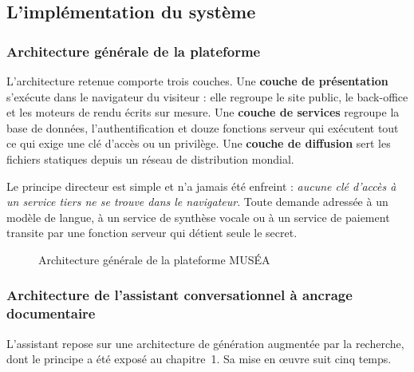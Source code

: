 \subsection{L'implémentation du système}
\label{sec:implementation}

\subsubsection{Architecture générale de la plateforme}

L'architecture retenue comporte trois couches. Une \textbf{couche de
présentation} s'exécute dans le navigateur du visiteur : elle regroupe le site
public, le back-office et les moteurs de rendu écrits sur mesure. Une
\textbf{couche de services} regroupe la base de données, l'authentification et
douze fonctions serveur qui exécutent tout ce qui exige une clé d'accès ou un
privilège. Une \textbf{couche de diffusion} sert les fichiers statiques depuis
un réseau de distribution mondial.

Le principe directeur est simple et n'a jamais été enfreint : \emph{aucune clé
d'accès à un service tiers ne se trouve dans le navigateur}. Toute demande
adressée à un modèle de langue, à un service de synthèse vocale ou à un service
de paiement transite par une fonction serveur qui détient seule le secret.

\begin{figure}[htbp]
\centering
{}
\caption{Architecture générale de la plateforme MUSÉA}
\label{fig:archi}
\end{figure}

\subsubsection{Architecture de l'assistant conversationnel à ancrage documentaire}

L'assistant repose sur une architecture de génération augmentée par la
recherche, dont le principe a été exposé au chapitre~1. Sa mise en œuvre suit
cinq temps.

